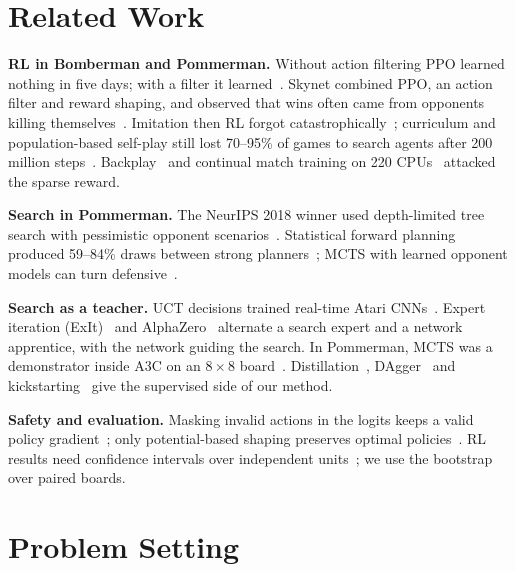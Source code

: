 \documentclass[conference]{IEEEtran}
\begin{document}
\section{Related Work}

\textbf{RL in Bomberman and Pommerman.} Without action filtering PPO learned nothing in five days; with a filter it learned~\cite{gao2019hard}. Skynet combined PPO, an action filter and reward shaping, and observed that wins often came from opponents killing themselves~\cite{gao2019skynet}. Imitation then RL forgot catastrophically~\cite{meisheri2019}; curriculum and population-based self-play still lost 70--95\% of games to search agents after 200 million steps~\cite{huynh2024}. Backplay~\cite{resnick2018backplay} and continual match training on 220 CPUs~\cite{peng2018continual} attacked the sparse reward.

\textbf{Search in Pommerman.} The NeurIPS 2018 winner used depth-limited tree search with pessimistic opponent scenarios~\cite{osogami2019}. Statistical forward planning produced 59--84\% draws between strong planners~\cite{perezliebana2019}; MCTS with learned opponent models can turn defensive~\cite{weil2023}.

\textbf{Search as a teacher.} UCT decisions trained real-time Atari CNNs~\cite{guo2014uct}. Expert iteration (ExIt)~\cite{anthony2017exit} and AlphaZero~\cite{silver2017agz,silver2017alphazero} alternate a search expert and a network apprentice, with the network guiding the search. In Pommerman, MCTS was a demonstrator inside A3C on an $8\times8$ board~\cite{kartal2018demonstrator,kartal2019safer}. Distillation~\cite{hinton2015distill,rusu2016distill}, DAgger~\cite{ross2011dagger} and kickstarting~\cite{schmitt2018kickstart} give the supervised side of our method.

\textbf{Safety and evaluation.} Masking invalid actions in the logits keeps a valid policy gradient~\cite{huang2022masking}; only potential-based shaping preserves optimal policies~\cite{ng1999shaping}. RL results need confidence intervals over independent units~\cite{henderson2018matters,agarwal2021precipice}; we use the bootstrap~\cite{efron1979bootstrap} over paired boards.

\section{Problem Setting}
\label{sec:setting}
\end{document}
